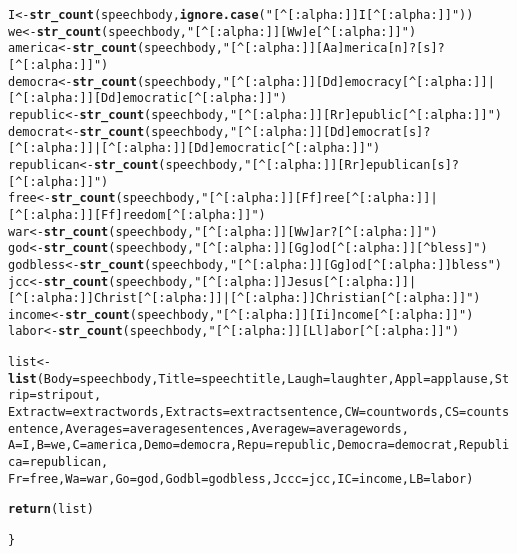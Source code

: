 \documentclass[english]{article}\usepackage[]{graphicx}\usepackage[]{color}
\makeatletter
\newcommand{\hlstr}[1]{\textcolor[rgb]{0.192,0.494,0.8}{#1}}%
\newcommand{\hlstd}[1]{\textcolor[rgb]{0.345,0.345,0.345}{#1}}%
\newcommand{\hlkwb}[1]{\textcolor[rgb]{0.69,0.353,0.396}{#1}}%
\newcommand{\hlkwc}[1]{\textcolor[rgb]{0.333,0.667,0.333}{#1}}%
\newcommand{\hlkwd}[1]{\textcolor[rgb]{0.737,0.353,0.396}{\textbf{#1}}}%
\newenvironment{kframe}{%
 \def\at@end@of@kframe{}%
 \ifinner\ifhmode%
  \def\at@end@of@kframe{\end{minipage}}%
  \begin{minipage}{\columnwidth}%
 \fi\fi%
 \def\FrameCommand##1{\hskip\@totalleftmargin \hskip-\fboxsep
 \colorbox{shadecolor}{##1}\hskip-\fboxsep
     \hskip-\linewidth \hskip-\@totalleftmargin \hskip\columnwidth}%
 \MakeFramed {\advance\hsize-\width
   \@totalleftmargin\z@ \linewidth\hsize
   \@setminipage}}%
 {\par\unskip\endMakeFramed%
 \at@end@of@kframe}
\newenvironment{knitrout}{}{} %
\makeatother
\begin{document}
\begin{knitrout}
\begin{kframe}
\begin{alltt}
        \hlstd{I} \hlkwb{<-} \hlkwd{str_count}\hlstd{(speechbody,}\hlkwd{ignore.case}\hlstd{(}\hlstr{"[^[:alpha:]]I[^[:alpha:]]"}\hlstd{))}
        \hlstd{we} \hlkwb{<-} \hlkwd{str_count}\hlstd{(speechbody,}\hlstr{"[^[:alpha:]][Ww]e[^[:alpha:]]"}\hlstd{)}
        \hlstd{america} \hlkwb{<-} \hlkwd{str_count}\hlstd{(speechbody,}\hlstr{"[^[:alpha:]][Aa]merica[n]?[s]?[^[:alpha:]]"}\hlstd{)}
        \hlstd{democra} \hlkwb{<-} \hlkwd{str_count}\hlstd{(speechbody,}\hlstr{"[^[:alpha:]][Dd]emocracy[^[:alpha:]]|[^[:alpha:]][Dd]emocratic[^[:alpha:]]"}\hlstd{)}
        \hlstd{republic} \hlkwb{<-} \hlkwd{str_count}\hlstd{(speechbody,}\hlstr{"[^[:alpha:]][Rr]epublic[^[:alpha:]]"}\hlstd{)}
        \hlstd{democrat} \hlkwb{<-} \hlkwd{str_count}\hlstd{(speechbody,}\hlstr{"[^[:alpha:]][Dd]emocrat[s]?[^[:alpha:]]|[^[:alpha:]][Dd]emocratic[^[:alpha:]]"}\hlstd{)}
        \hlstd{republican} \hlkwb{<-} \hlkwd{str_count}\hlstd{(speechbody,}\hlstr{"[^[:alpha:]][Rr]epublican[s]?[^[:alpha:]]"}\hlstd{)}
        \hlstd{free} \hlkwb{<-} \hlkwd{str_count}\hlstd{(speechbody,}\hlstr{"[^[:alpha:]][Ff]ree[^[:alpha:]]|[^[:alpha:]][Ff]reedom[^[:alpha:]]"}\hlstd{)}
        \hlstd{war} \hlkwb{<-} \hlkwd{str_count}\hlstd{(speechbody,}\hlstr{"[^[:alpha:]][Ww]ar?[^[:alpha:]]"}\hlstd{)}
        \hlstd{god} \hlkwb{<-} \hlkwd{str_count}\hlstd{(speechbody,}\hlstr{"[^[:alpha:]][Gg]od[^[:alpha:]][^bless]"}\hlstd{)}
        \hlstd{godbless} \hlkwb{<-} \hlkwd{str_count}\hlstd{(speechbody,}\hlstr{"[^[:alpha:]][Gg]od[^[:alpha:]]bless"}\hlstd{)}
        \hlstd{jcc} \hlkwb{<-} \hlkwd{str_count}\hlstd{(speechbody,}\hlstr{"[^[:alpha:]]Jesus[^[:alpha:]]|[^[:alpha:]]Christ[^[:alpha:]]|[^[:alpha:]]Christian[^[:alpha:]]"}\hlstd{)}
        \hlstd{income} \hlkwb{<-} \hlkwd{str_count}\hlstd{(speechbody,}\hlstr{"[^[:alpha:]][Ii]ncome[^[:alpha:]]"}\hlstd{)}
        \hlstd{labor} \hlkwb{<-} \hlkwd{str_count}\hlstd{(speechbody,}\hlstr{"[^[:alpha:]][Ll]abor[^[:alpha:]]"}\hlstd{)}


        \hlstd{list}\hlkwb{<-}\hlkwd{list}\hlstd{(}\hlkwc{Body}\hlstd{=speechbody,}\hlkwc{Title}\hlstd{=speechtitle,}\hlkwc{Laugh}\hlstd{=laughter,}\hlkwc{Appl}\hlstd{=applause,}\hlkwc{Strip}\hlstd{=stripout,}
          \hlkwc{Extractw}\hlstd{=extractwords,}\hlkwc{Extracts}\hlstd{=extractsentence,}\hlkwc{CW}\hlstd{=countwords,} \hlkwc{CS}\hlstd{=countsentence,}\hlkwc{Averages}\hlstd{=averagesentences,} \hlkwc{Averagew}\hlstd{=averagewords,}
                  \hlkwc{A}\hlstd{=I,} \hlkwc{B}\hlstd{=we,} \hlkwc{C}\hlstd{=america,} \hlkwc{Demo}\hlstd{=democra,} \hlkwc{Repu}\hlstd{=republic,} \hlkwc{Democra}\hlstd{=democrat,} \hlkwc{Republica}\hlstd{=republican,}
                  \hlkwc{Fr}\hlstd{=free,} \hlkwc{Wa}\hlstd{=war,} \hlkwc{Go}\hlstd{=god,} \hlkwc{Godbl}\hlstd{=godbless,} \hlkwc{Jccc}\hlstd{=jcc,} \hlkwc{IC}\hlstd{=income,} \hlkwc{LB}\hlstd{=labor)}

    \hlkwd{return}\hlstd{(list)}

\hlstd{\}}
\end{alltt}
\end{kframe}
\end{knitrout}
\end{document}
